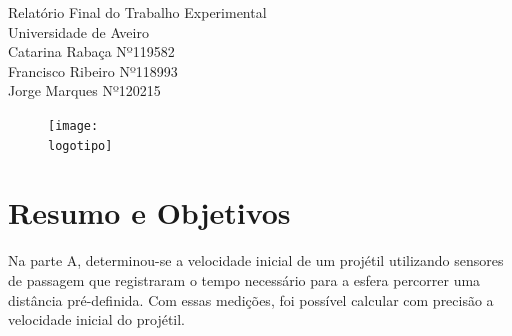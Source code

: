 \documentclass{report}
\begin{document}
%
\def\titulo{Relatório Final do Trabalho Experimental}
\def\data{DATA}
\def\autores{Catarina Rabaça Nº119582 \\[10pt] Francisco Ribeiro Nº118993 \\[10pt] Jorge Marques Nº120215}  %
\def\autorescontactos{(nmec1) autor1@ua.pt \\ (nmec2) autor2@ua.pt}
\def\departamento{Dept. de Eletrónica, Telecomunicações e Informática}
\def\empresa{Universidade de Aveiro}
\def\logotipo{ua.pdf}
%
%
\begin{titlepage}

\begin{center}
%
\vspace*{50mm}
%
{\Huge \titulo}\\ 
%
\vspace{10mm}
%
{\Large \empresa}\\
%
\vspace{10mm}
%
{\LARGE \autores}\\  %
%
\vspace{30mm}
%
\begin{figure}[h]
\center
\texttt{[image: \\logotipo]}  %
\end{figure}
%
\vspace{30mm}
\end{center}
%
\begin{flushright}
\versao
\end{flushright}
\end{titlepage}



\renewcommand{\contentsname}{Índice}
\tableofcontents


\clearpage
{}

\chapter*{Resumo e Objetivos}
Na parte A, determinou-se a velocidade inicial de um projétil utilizando sensores de passagem que registraram o tempo necessário para a esfera percorrer uma distância pré-definida. Com essas medições, foi possível calcular com precisão a velocidade inicial do projétil.
\end{document}
